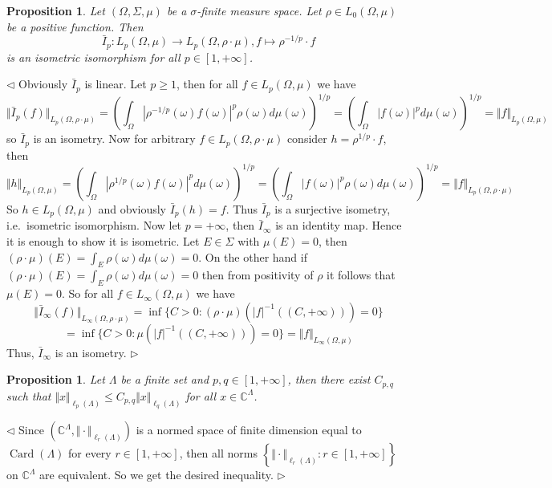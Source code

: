 \documentclass[12pt]{article}
\newtheorem{proposition}[theorem]{Proposition}
\newenvironment{proof}{\par $\triangleleft$}{$\triangleright$}
\begin{document}
\begin{proposition}\label{ChngOfDenst} Let $(\Omega,\Sigma,\mu)$ be a
    $\sigma$-finite measure space. Let $\rho\in L_0(\Omega,\mu)$ be a  positive
    function. Then
    $$
        \bar{I}_p:L_p(\Omega,\mu)\to
        L_p(\Omega,\rho\cdot \mu), f\mapsto\rho^{-1/p}\cdot f
    $$
    is an isometric isomorphism for all $p\in[1,+\infty]$.
\end{proposition}
\begin{proof} Obviously $\bar{I}_p$ is linear. Let $p\geq 1$,
    then for
    all $f\in L_p(\Omega,\mu)$ we have
    $$
        \Vert \bar{I}_p(f)\Vert_{L_p(\Omega,\rho\cdot\mu)}
        ={\left(
        \int_{\Omega}
            {|\rho^{-1/p}(\omega)f(\omega)|}^p\rho(\omega)d\mu(\omega)
        \right)}^{1/p}
            ={\left(\int_{\Omega}{|f(\omega)|}^p d\mu(\omega) \right)}^{1/p}
        =\Vert f\Vert_{L_p(\Omega,\mu)}
    $$
    so $\bar{I}_p$ is an isometry. Now for arbitrary
    $f\in L_p(\Omega,\rho\cdot\mu)$ consider $h=\rho^{1/p}\cdot f$, then
    $$
        \Vert h\Vert_{L_p(\Omega,\mu)}
        ={\left(
        \int_{\Omega}
            {|\rho^{1/p}(\omega)f(\omega)|}^p d\mu(\omega)
        \right)}^{1/p}
            ={\left(
                \int_{\Omega}{|f(\omega)|}^p\rho(\omega)d\mu(\omega)
                \right)}^{1/p}
        =\Vert f\Vert_{L_p(\Omega,\rho\cdot\mu)}
    $$
    So $h\in L_p(\Omega,\mu)$ and obviously $\bar{I}_p(h)=f$. Thus $\bar{I}_p$
    is a surjective isometry, i.e.\ isometric isomorphism. Now let $p=+\infty$,
    then $\bar{I}_\infty$ is an identity map. Hence it is enough to show it is
    isometric. Let $E\in\Sigma$ with $\mu(E)=0$, then
    $(\rho\cdot\mu)(E)=\int_E\rho(\omega)d\mu(\omega)=0$. On the other hand if
    $(\rho\cdot\mu)(E)=\int_E\rho(\omega)d\mu(\omega)=0$ then from positivity of
    $\rho$ it follows that $\mu(E)=0$. So for all $f\in L_\infty(\Omega,\mu)$ we
    have
    $$
        \Vert\bar{I}_\infty(f)\Vert_{L_\infty(\Omega,\rho\cdot\mu)}
        =\inf \{C>0:(\rho\cdot\mu)(|f|^{-1}((C,+\infty)))=0 \}
    $$
    $$
        =\inf \{C>0:\mu(|f|^{-1}((C,+\infty)))=0 \}
        =\Vert f\Vert_{L_\infty(\Omega,\mu)}
    $$
    Thus, $\bar{I}_\infty$ is an isometry.
\end{proof}

\begin{proposition}\label{FinDimlpEquivNorms} Let $\Lambda$ be a finite set and
    $p,q\in[1,+\infty]$, then there exist $C_{p,q}$ such that
    $\Vert x\Vert_{\ell_p(\Lambda)}\leq C_{p,q}\Vert x\Vert_{\ell_q(\Lambda)}$
    for all $x\in\mathbb{C}^\Lambda$.
\end{proposition}
\begin{proof} Since $(\mathbb{C}^\Lambda,\Vert\cdot\Vert_{\ell_r(\Lambda)})$ is
    a normed space of finite dimension equal to $\operatorname{Card}(\Lambda)$
    for every $r\in[1,+\infty]$, then all norms
    $\left \{
        \Vert\cdot\Vert_{\ell_r(\Lambda)}:r\in[1,+\infty]
        \right \}$ on
    $\mathbb{C}^\Lambda$ are equivalent. So we get the desired inequality.
\end{proof}
\end{document}
